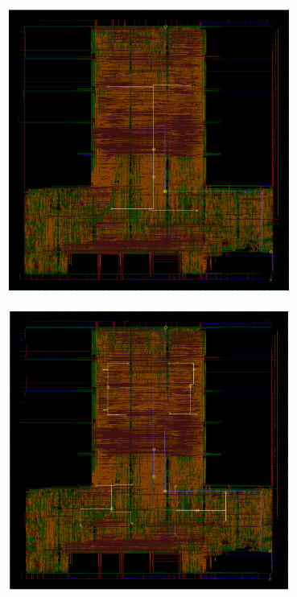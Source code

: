 \documentclass[compress]{beamer}
\begin{document}
\begin{frame}
	\begin{center}
		\includegraphics[width=0.7\textwidth]{clk2}
	\end{center}
\end{frame}
\begin{frame}
	\begin{center}
		\includegraphics[width=0.7\textwidth]{clk3}
	\end{center}
\end{frame}
\end{document}
